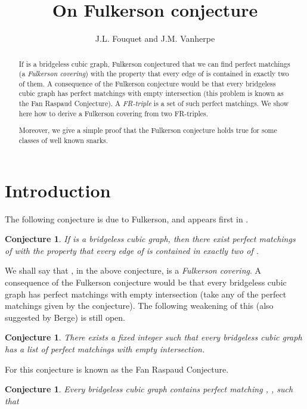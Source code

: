 \documentclass{amsart}
\title[]{On Fulkerson conjecture}
\author{J.L. Fouquet and J.M. Vanherpe}
\newtheorem{conj}[thm]{Conjecture}
\theoremstyle{definition}
\theoremstyle{remark}
\begin{document}

\begin{abstract}
If  is a bridgeless cubic graph, Fulkerson conjectured that we
can find   perfect matchings (a {\em Fulkerson covering})  with
the property that every edge of  is contained in exactly two of
them. A consequence of the Fulkerson conjecture would be that every
bridgeless cubic graph has  perfect matchings with empty
intersection (this problem is known as the Fan Raspaud Conjecture).
A {\em FR-triple} is a set of  such perfect matchings. We show
here how to derive a Fulkerson covering from two FR-triples.

Moreover, we give a simple proof that the Fulkerson conjecture holds
true for some classes of well known snarks.
\end{abstract}

\maketitle

\section{Introduction}
The following conjecture is due to Fulkerson, and appears first in
\cite{Ful71}.
\begin{conj}\label{Conjecture:Fulkerson} If  is a bridgeless
cubic graph, then there exist  perfect matchings 
of  with the property that every edge of  is contained in
exactly two of .
\end{conj}

We shall say that  , in the above
conjecture, is a {\em Fulkerson covering}. A consequence of the
Fulkerson conjecture would be that every bridgeless cubic graph has
 perfect matchings with empty intersection (take any  of the
 perfect matchings given by the conjecture). The following
weakening of this (also suggested by Berge) is still open.

\begin{conj}\label{Conjecture:Berge2}There exists a fixed integer 
such that every bridgeless cubic graph has a list of  perfect
matchings with empty intersection.
\end{conj}


For  this conjecture is known as the Fan Raspaud Conjecture.

\begin{conj}\cite{FanRas} \label{Conjecture:FanRaspaud} Every
bridgeless cubic graph contains perfect matching , , 
such that

\end{conj}
\end{document}
